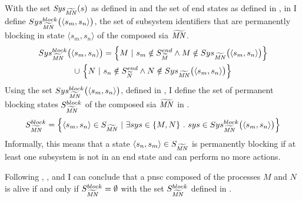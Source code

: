 With the set $\mathit{Sys}_{\widetilde{\mathit{MN}}}(s)$ as defined in \Equ{\ref{eq_sia_sys_alive}} and the set of end states as defined in \Equ{\ref{eq_sia_end}}, in \Equ{\ref{eq_sia_sys}} I define $Sys_{\widetilde{\mathit{MN}}}^{block}\big ( \langle s_m, s_n \rangle \big )$, the set of subsystem identifiers that are permanently blocking in state $\langle s_m, s_n \rangle$ of the composed \gls{sia} $\widetilde{\mathit{MN}}$.
\begin{multline}
    \label{eq_sia_sys}
    Sys_{\widetilde{\mathit{MN}}}^{block}\big ( \langle s_m, s_n \rangle \big ) = \Big \{ M \ | \ s_m \notin S_{\widetilde{M}}^{end} \land M \notin Sys_{\widetilde{\mathit{MN}}} \big (\langle s_m, s_n \rangle \big ) \Big \}
    \\ \cup \ \Big \{ N \ | \ s_n \notin S_{\widetilde{N}}^{end} \land N \notin Sys_{\widetilde{\mathit{MN}}}\big (\langle s_m, s_n \rangle \big ) \Big \}
\end{multline}
Using the set $Sys_{\widetilde{\mathit{MN}}}^{block}\big ( \langle s_m, s_n \rangle \big )$, defined in \Equ{\ref{eq_sia_sys}}, I define the set of permanent blocking states $S_{\widetilde{\mathit{MN}}}^{block}$ of the composed \gls{sia} $\widetilde{\mathit{MN}}$ in \Equ{\ref{eq_sia_block}}.
\begin{equation}
    \label{eq_sia_block}
    S_{\widetilde{\mathit{MN}}}^{block} = \Big \{ \langle s_m, s_n \rangle \in S_{\widetilde{\mathit{MN}}} \ | \ \exists sys \in \{ M, N \} \ . \ sys \in Sys_{\widetilde{\mathit{MN}}}^{block}\big ( \langle s_m, s_n \rangle \big ) \Big \}
\end{equation}
Informally, this means that a state $\langle s_n, s_m \rangle \in S_{\widetilde{\mathit{MN}}}$ is permanently blocking if at least one subsystem is not in an end state and can perform no more actions.

Following \Def{\ref{def_liveness_sia}}, \Def{\ref{def_liveness_process}}, and \Def{\ref{def_liveness}} I can conclude that a \gls{pnsc} composed of the processes $M$ and $N$ is alive if and only if $S_{\widetilde{\mathit{MN}}}^{block} = \emptyset$ with the set $S_{\widetilde{\mathit{MN}}}^{block}$ defined in \Equ{\ref{eq_sia_block}}.

